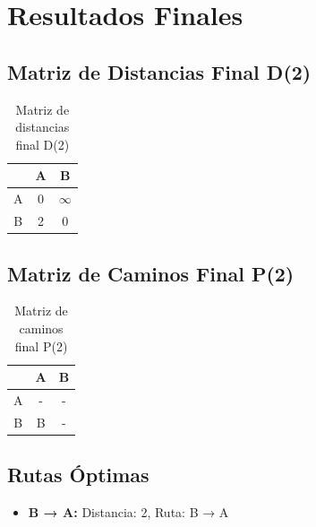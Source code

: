 \documentclass[12pt]{article}
\begin{document}
\clearpage
\section{Resultados Finales}
\subsection{Matriz de Distancias Final D(2)}
\begin{table}[h!]
\centering
\begin{tabular}{|c|c|c|}
\hline
 & A & B \\\hline
A & 0 & $\infty$ \\\hline
B & 2 & 0 \\\hline
\end{tabular}
\caption{Matriz de distancias final D(2)}
\end{table}

\clearpage
\subsection{Matriz de Caminos Final P(2)}
\begin{table}[h!]
\centering
\begin{tabular}{|c|c|c|}
\hline
 & A & B \\\hline
A & - & - \\\hline
B & B & - \\\hline
\end{tabular}
\caption{Matriz de caminos final P(2)}
\end{table}

\clearpage
\subsection{Rutas Óptimas}
\begin{itemize}
\item \textbf{B → A:} Distancia: 2, Ruta: B → A
\end{itemize}
\end{document}
